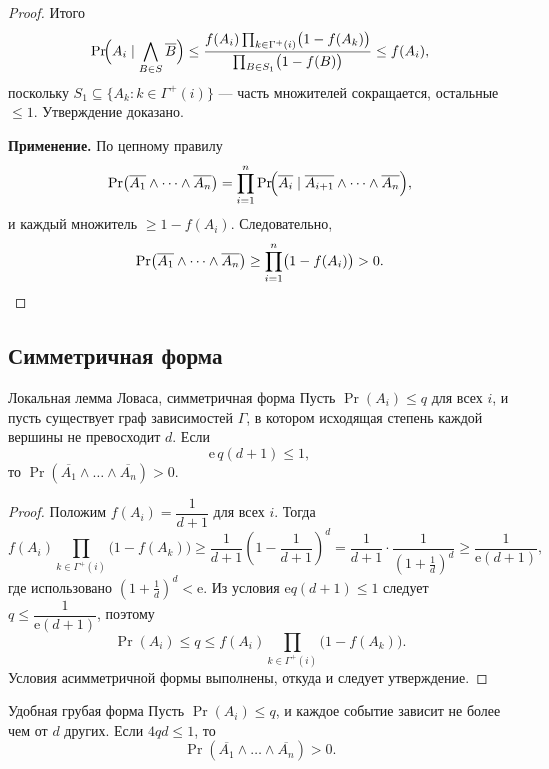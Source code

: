 \begin{proof}
	Итого
	\[
	\Pr\!\Bigl(A_i\mid \bigwedge_{B\in S}\overline B\Bigr)
	\le\frac{f(A_i)\prod_{k\in \Gamma^+(i)}\bigl(1-f(A_k)\bigr)}{\prod_{B\in S_1}\bigl(1-f(B)\bigr)}
	\le f(A_i),
	\]
	поскольку $S_1\subseteq\{A_k:k\in\Gamma^+(i)\}$ — часть множителей сокращается, остальные $\le 1$. Утверждение доказано.

	\textbf{Применение.} По цепному правилу
	\[
	\Pr\!\left(\overline{A_1}\wedge\dots\wedge\overline{A_n}\right)
	=\prod_{i=1}^{n}\Pr\!\Bigl(\overline{A_i}\mid \overline{A_{i+1}}\wedge\dots\wedge\overline{A_n}\Bigr),
	\]
	и каждый множитель $\ge 1-f(A_i)$. Следовательно,
	\[
	\Pr\!\left(\overline{A_1}\wedge\dots\wedge\overline{A_n}\right)\ge\prod_{i=1}^{n}\bigl(1-f(A_i)\bigr)>0.\qedhere
	\]
\end{proof}

\subsection{Симметричная форма}

\begin{Theorem}{Локальная лемма Ловаса, симметричная форма}{}
	Пусть $\Pr(A_i)\le q$ для всех $i$, и пусть существует граф зависимостей $\Gamma$, в котором исходящая степень каждой вершины не превосходит $d$. Если
	\[
	\mathrm e\,q(d+1)\le 1,
	\]
	то $\Pr\!\left(\overline{A_1}\wedge\dots\wedge\overline{A_n}\right)>0.$
\end{Theorem}

\begin{proof}
	Положим $f(A_i)=\dfrac{1}{d+1}$ для всех $i$. Тогда
	\[
	f(A_i)\prod_{k\in\Gamma^+(i)}\bigl(1-f(A_k)\bigr)
	\ge\frac{1}{d+1}\left(1-\frac{1}{d+1}\right)^d
	=\frac{1}{d+1}\cdot\frac{1}{\left(1+\frac1d\right)^d}
	\ge\frac{1}{\mathrm e(d+1)},
	\]
	где использовано $\left(1+\tfrac1d\right)^d<\mathrm e$. Из условия $\mathrm e q(d+1)\le 1$ следует $q\le\dfrac{1}{\mathrm e(d+1)}$, поэтому
	\[
	\Pr(A_i)\le q\le f(A_i)\prod_{k\in\Gamma^+(i)}\bigl(1-f(A_k)\bigr).
	\]
	Условия асимметричной формы выполнены, откуда и следует утверждение.
\end{proof}

\begin{Corollary}{Удобная грубая форма}{}
	Пусть $\Pr(A_i)\le q$, и каждое событие зависит не более чем от $d$ других. Если $4qd\le 1$, то
	\[
	\Pr\!\left(\overline{A_1}\wedge\dots\wedge\overline{A_n}\right)>0.
	\]
\end{Corollary}

